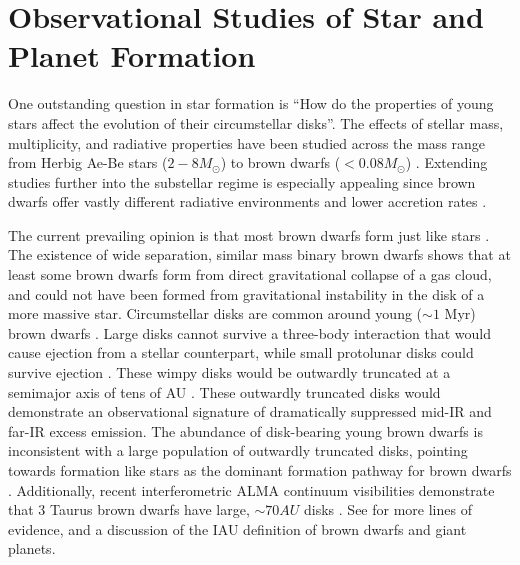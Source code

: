 \section{Observational Studies of Star and Planet Formation}

One outstanding question in star formation is ``How do the properties of young stars affect the evolution of their circumstellar disks''.  The effects of stellar mass, multiplicity, and radiative properties have been studied across the mass range from Herbig Ae-Be stars ($2-8 M_{\odot}$) to brown dwarfs ($<0.08 M_{\odot}$) \citep{2011ARA&A..49...67W}.  Extending studies further into the substellar regime is especially appealing since brown dwarfs offer vastly different radiative environments and lower accretion rates \citep{2003ApJ...592..266M,2009ApJ...696.1589H}.

The current prevailing opinion is that most brown dwarfs form just like stars \citep{2014prpl.conf..619C}.  The existence of wide separation, similar mass binary brown dwarfs \citep{2004ApJ...614..398L,2006PhDT.........2A,2007ApJ...660.1492C,2009ApJ...691.1265L} shows that at least some brown dwarfs form from direct gravitational collapse of a gas cloud, and could not have been formed from gravitational instability in the disk of a more massive star.  Circumstellar disks are common around young ($\sim 1$ Myr) brown dwarfs \citep{2005ApJ...635L..93L,allers06,2012ARA&A..50...65L,2013A&A...559A.126A}.  Large disks cannot survive a three-body interaction that would cause ejection from a stellar counterpart, while small protolunar disks could survive ejection \citep{2009MNRAS.392..413S}.  These wimpy disks would be outwardly truncated at a semimajor axis of tens of AU \citep{2009MNRAS.392..413S}.  These outwardly truncated disks would demonstrate an observational signature of dramatically suppressed mid-IR and far-IR excess emission.  The abundance of disk-bearing young brown dwarfs is inconsistent with a large population of outwardly truncated disks, pointing towards formation like stars as the dominant formation pathway for brown dwarfs \citep{2012ARA&A..50...65L}.  Additionally, recent interferometric ALMA continuum visibilities demonstrate that 3 Taurus brown dwarfs have large, $\sim70 AU$ disks \citep{2014ApJ...791...20R}.  See \citet{2014prpl.conf..619C} for more lines of evidence, and a discussion of the IAU definition of brown dwarfs and giant planets.

